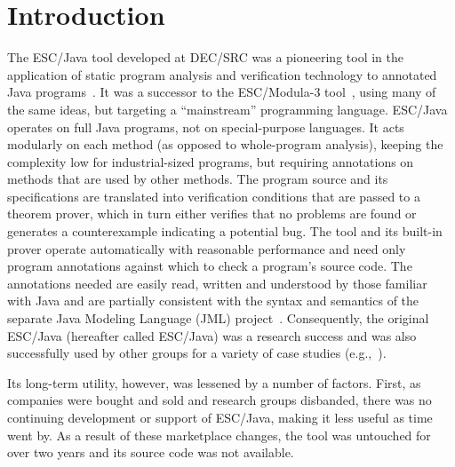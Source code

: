 \documentclass{llncs}
\begin{document}



\section{Introduction}

The ESC/Java tool developed at DEC/SRC was a pioneering tool in the
application of static program analysis and verification technology to
annotated Java programs~\cite{Flanagan-etal02}.  It was a successor to
the ESC/Modula-3 tool~\cite{ESCModula3}, using many of the same
ideas, but targeting a ``mainstream'' programming language.  ESC/Java 
operates on full Java programs, not on special-purpose languages.  It acts
modularly on each method (as opposed to whole-program analysis), 
keeping the complexity low for industrial-sized programs, but requiring 
annotations on methods that are used by other methods.  The program source
and its specifications are translated into verification conditions that are passed
to a theorem prover, which in turn either verifies that no problems are found or
generates a counterexample indicating a potential bug. The tool
and its built-in prover operate automatically with reasonable
performance and need only program annotations against which to check
a program's source code.  The annotations needed are easily read,
written and understood by those familiar with Java and are partially
consistent with the syntax and semantics of the separate Java Modeling
Language (JML) project~\cite{jmlpapers,Leavens-etal00}.  Consequently,
the original ESC/Java (hereafter called ESC/Java) was a research
success and was also successfully used by other groups for a variety
of case studies (e.g.,~\cite{Hub03,HOP04}).


Its long-term utility, however, was lessened by a number of factors.
First, as companies were bought and sold and research groups
disbanded, there was no continuing development or support of ESC/Java,
making it less useful as time went by.  As a result of these
marketplace changes, the tool was untouched for over two years and its
source code was not available.
\end{document}
